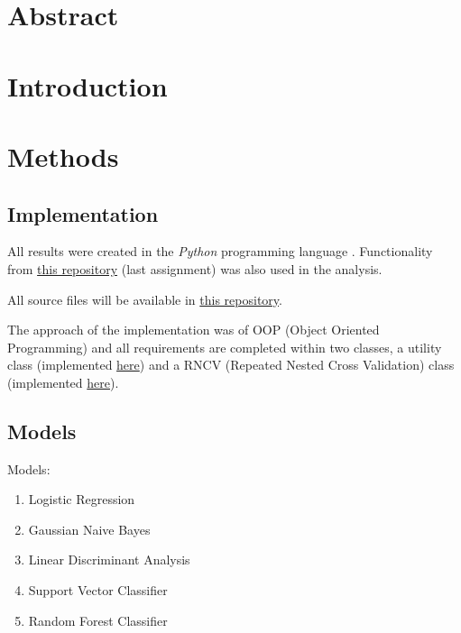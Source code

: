 \documentclass[12pt, a4paper]{article}
\begin{document}
\begin{multicols}{2}

    \section*{Abstract} \label{sec:abs}

    \section{Introduction} \label{sec:intro}

    \section{Methods} \label{sec:methods}

    \subsection{Implementation} \label{subsec:impl}

    All results were created in the \textit{Python} programming language \cite{noauthor_3132_nodate}. Functionality from \href{https://github.com/ArisPodotas/Assignment-1-MLICB}{this repository} (last assignment) was also used in the analysis.
    \newline

    All source files will be available in \href{https://github.com/ArisPodotas/Assignment-2-MLICB/tree/master}{this repository}.
    \newline

    The approach of the implementation was of OOP (Object Oriented Programming) and all requirements are completed within two classes, a utility class (implemented \href{https://github.com/ArisPodotas/Assignment-2-MLICB/blob/master/src/utils.py}{here}) and a RNCV (Repeated Nested Cross Validation) class (implemented \href{https://github.com/ArisPodotas/Assignment-2-MLICB/blob/master/src/classes.py}{here}).
    \newline

    \subsection{Models} \label{subsec:models}

    Models:
    \newline

    \begin{enumerate} \label{enm:models}
        \item Logistic Regression
        \item Gaussian Naive Bayes
        \item Linear Discriminant Analysis
        \item Support Vector Classifier
        \item Random Forest Classifier
    \end{enumerate}


\end{multicols}
\end{document}
